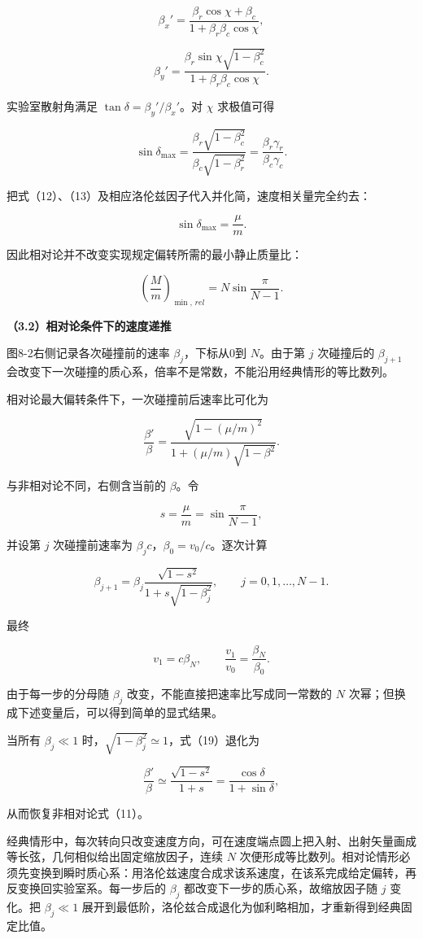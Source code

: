 \documentclass[12pt,a4paper,UTF8]{ctexart}
\begin{document}
\[\beta_x'=
\frac{\beta_r\cos\chi+\beta_c}
{1+\beta_r\beta_c\cos\chi},\]

\[\beta_y'=
\frac{\beta_r\sin\chi\sqrt{1-\beta_c^2}}
{1+\beta_r\beta_c\cos\chi}.\]

实验室散射角满足 \(\tan\delta=\beta_y'/\beta_x'\)。对 \(\chi\)
求极值可得

\[\sin\delta_{\max}
=\frac{\beta_r\sqrt{1-\beta_c^2}}
{\beta_c\sqrt{1-\beta_r^2}}
=\frac{\beta_r\gamma_r}{\beta_c\gamma_c}.\]

把式（12）、（13）及相应洛伦兹因子代入并化简，速度相关量完全约去：

\[\boxed{\sin\delta_{\max}=\frac\mu m}.\]

因此相对论并不改变实现规定偏转所需的最小静止质量比：

\[\boxed{
\left(\frac Mm\right)_{\min,\,rel}
=N\sin\frac{\pi}{N-1}}.\]

\textbf{（3.2）相对论条件下的速度递推}

图8-2右侧记录各次碰撞前的速率 \(\beta_j\)，下标从0到 \(N\)。由于第 \(j\)
次碰撞后的 \(\beta_{j+1}\)
会改变下一次碰撞的质心系，倍率不是常数，不能沿用经典情形的等比数列。

相对论最大偏转条件下，一次碰撞前后速率比可化为

\[\boxed{
\frac{\beta'}{\beta}
=\frac{\sqrt{1-(\mu/m)^2}}
{1+(\mu/m)\sqrt{1-\beta^2}}}.\]

与非相对论不同，右侧含当前的 \(\beta\)。令

\[s=\frac\mu m=\sin\frac{\pi}{N-1},\]

并设第 \(j\) 次碰撞前速率为 \(\beta_jc\)，\(\beta_0=v_0/c\)。逐次计算

\[\boxed{
\beta_{j+1}
=\beta_j\frac{\sqrt{1-s^2}}
{1+s\sqrt{1-\beta_j^2}},
\qquad j=0,1,\ldots,N-1}.\]

最终

\[\boxed{v_1=c\beta_N},\qquad
\boxed{\frac{v_1}{v_0}=\frac{\beta_N}{\beta_0}}.\]

由于每一步的分母随 \(\beta_j\) 改变，不能直接把速率比写成同一常数的
\(N\) 次幂；但换成下述变量后，可以得到简单的显式结果。

当所有 \(\beta_j\ll1\) 时，\(\sqrt{1-\beta_j^2}\simeq1\)，式（19）退化为

\[\frac{\beta'}\beta\simeq
\frac{\sqrt{1-s^2}}{1+s}
=\frac{\cos\delta}{1+\sin\delta},\]

从而恢复非相对论式（11）。

经典情形中，每次转向只改变速度方向，可在速度端点圆上把入射、出射矢量画成等长弦，几何相似给出固定缩放因子，连续
\(N\)
次便形成等比数列。相对论情形必须先变换到瞬时质心系：用洛伦兹速度合成求该系速度，在该系完成给定偏转，再反变换回实验室系。每一步后的
\(\beta_j\) 都改变下一步的质心系，故缩放因子随 \(j\) 变化。把
\(\beta_j\ll1\)
展开到最低阶，洛伦兹合成退化为伽利略相加，才重新得到经典固定比值。
\end{document}
